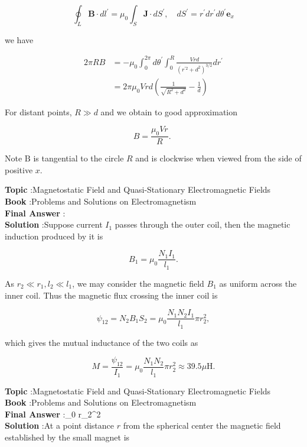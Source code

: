 \documentclass[10pt]{article}
\begin{document}
$$
\oint_{L} \mathbf{B} \cdot d l^{\prime}=\mu_{0} \int_{S} \mathbf{J} \cdot d S^{\prime}, \quad d S^{\prime}=r^{\prime} d r^{\prime} d \theta^{\prime} \mathbf{e}_{x}
$$

we have

$$
\begin{aligned}
2 \pi R B &=-\mu_{0} \int_{0}^{2 \pi} d \theta^{\prime} \int_{0}^{R} \frac{V r d}{\left(r^{\prime 2}+d^{2}\right)^{3 / 2}} d r^{\prime} \\
&=2 \pi \mu_{0} V r d\left(\frac{1}{\sqrt{R^{2}+d^{2}}}-\frac{1}{d}\right)
\end{aligned}
$$

For distant points, $R \gg d$ and we obtain to good approximation

$$
B=\frac{\mu_{0} V r}{R} \text {. }
$$

Note $\mathrm{B}$ is tangential to the circle $R$ and is clockwise when viewed from the side of positive $x$.

\textbf{Topic} :Magnetostatic Field and Quasi-Stationary Electromagnetic Fields\\
\textbf{Book} :Problems and Solutions on Electromagnetism\\
\textbf{Final Answer} :\\


\textbf{Solution} :Suppose current $I_{1}$ passes through the outer coil, then the magnetic induction produced by it is

$$
B_{1}=\mu_{0} \frac{N_{1} I_{1}}{l_{1}} .
$$

As $r_{2} \ll r_{1}, l_{2} \ll l_{1}$, we may consider the magnetic field $B_{1}$ as uniform across the inner coil. Thus the magnetic flux crossing the inner coil is

$$
\psi_{12}=N_{2} B_{1} S_{2}=\mu_{0} \frac{N_{1} N_{2} I_{1}}{l_{1}} \pi r_{2}^{2},
$$

which gives the mutual inductance of the two coils as

$$
M=\frac{\psi_{12}}{I_{1}}=\mu_{0} \frac{N_{1} N_{2}}{l_{1}} \pi r_{2}^{2} \approx 39.5 \mu \mathrm{H} .
$$

\textbf{Topic} :Magnetostatic Field and Quasi-Stationary Electromagnetic Fields\\
\textbf{Book} :Problems and Solutions on Electromagnetism\\
\textbf{Final Answer} :\mu_{0}  \pi r_{2}^{2}  \mu {}\\


\textbf{Solution} :At a point distance $r$ from the spherical center the magnetic field established by the small magnet is
\end{document}
